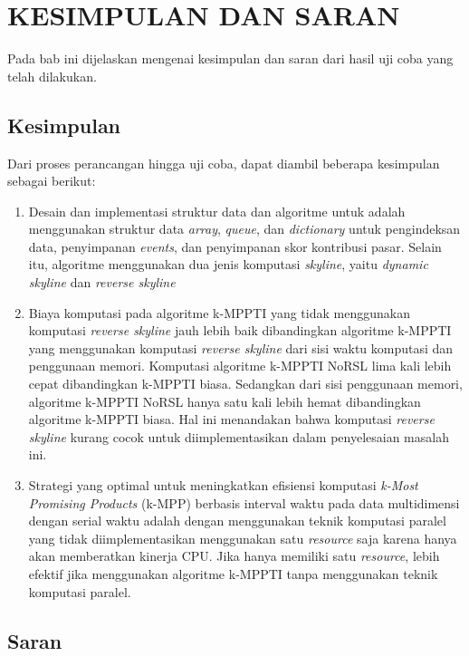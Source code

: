 \chapter{KESIMPULAN DAN SARAN}\label{chap:kesimpulan-saran}

\tab Pada bab ini dijelaskan mengenai kesimpulan dan saran dari hasil uji coba yang telah dilakukan.

\section{Kesimpulan}

\tab Dari proses perancangan hingga uji coba, dapat diambil beberapa kesimpulan sebagai berikut:

\begin{enumerate}
	\item Desain dan implementasi struktur data dan algoritme untuk \problem adalah menggunakan struktur data \textit{array}, \textit{queue}, dan \textit{dictionary} untuk pengindeksan data, penyimpanan \textit{events}, dan penyimpanan skor kontribusi pasar. Selain itu, algoritme menggunakan dua jenis komputasi \textit{skyline}, yaitu \textit{dynamic skyline} dan \textit{reverse skyline}
	
	\item Biaya komputasi pada algoritme k-MPPTI yang tidak menggunakan komputasi \textit{reverse skyline} jauh lebih baik dibandingkan algoritme k-MPPTI yang menggunakan komputasi \textit{reverse skyline} dari sisi waktu komputasi dan penggunaan memori. Komputasi algoritme k-MPPTI NoRSL lima kali lebih cepat dibandingkan k-MPPTI biasa. Sedangkan dari sisi penggunaan memori, algoritme k-MPPTI NoRSL hanya satu kali lebih hemat dibandingkan algoritme k-MPPTI biasa. Hal ini menandakan bahwa komputasi \textit{reverse skyline} kurang cocok untuk diimplementasikan dalam penyelesaian masalah ini.
	\pagebreak
	\item Strategi yang optimal untuk meningkatkan efisiensi komputasi \textit{k-Most Promising Products} (k-MPP) berbasis interval waktu pada data multidimensi dengan serial waktu adalah dengan menggunakan teknik komputasi paralel yang tidak diimplementasikan menggunakan satu \textit{resource} saja karena hanya akan memberatkan kinerja CPU. Jika hanya memiliki satu \textit{resource}, lebih efektif jika menggunakan algoritme k-MPPTI tanpa menggunakan teknik komputasi paralel.
\end{enumerate}

\section{Saran}

